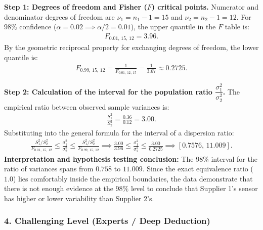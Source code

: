 \begin{solproblema}
	\textbf{Step 1: Degrees of freedom and Fisher ($F$) critical points.}
	Numerator and denominator degrees of freedom are $\nu_1 = n_1 - 1 = 15$ and $\nu_2 = n_2 - 1 = 12$.
	For $98\%$ confidence ($\alpha = 0.02 \implies \alpha/2 = 0.01$), the upper quantile in the $F$ table is:
	\begin{align}
		F_{0.01, \, 15, \, 12} = 3.96.
	\end{align}
	By the geometric reciprocal property for exchanging degrees of freedom, the lower quantile is:
	\begin{align}
		F_{0.99, \, 15, \, 12} = \frac{1}{F_{0.01, \, 12, \, 15}} = \frac{1}{3.67} \approx 0.2725.
	\end{align}
	
	\textbf{Step 2: Calculation of the interval for the population ratio $\dfrac{\sigma_1^2}{\sigma_2^2}$.}
	The empirical ratio between observed sample variances is:
	\begin{align}
		\frac{S_1^2}{S_2^2} = \frac{0.36}{0.12} = 3.00.
	\end{align}
	Substituting into the general formula for the interval of a dispersion ratio:
	\begin{align}
		\frac{S_1^2 / S_2^2}{F_{0.01, \, 15, \, 12}} \le \frac{\sigma_1^2}{\sigma_2^2} \le \frac{S_1^2 / S_2^2}{F_{0.99, \, 15, \, 12}} \implies \frac{3.00}{3.96} \le \frac{\sigma_1^2}{\sigma_2^2} \le \frac{3.00}{0.2725} \implies [0.7576, \, 11.009].
	\end{align}
	\textbf{Interpretation and hypothesis testing conclusion:} The 98\% interval for the ratio of variances spans from $0.758$ to $11.009$. Since the exact equivalence ratio ($1.0$) lies comfortably inside the empirical boundaries, the data demonstrate that there is not enough evidence at the $98\%$ level to conclude that Supplier 1's sensor has higher or lower variability than Supplier 2's.
\end{solproblema}

\subsubsection*{4. Challenging Level (Experts / Deep Deduction)}

